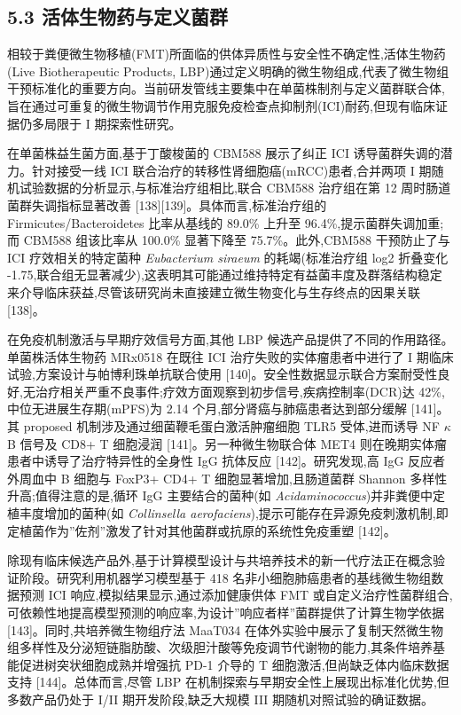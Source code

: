 \subsection{5.3 活体生物药与定义菌群}\label{ux6d3bux4f53ux751fux7269ux836fux4e0eux5b9aux4e49ux83ccux7fa4}

相较于粪便微生物移植(FMT)所面临的供体异质性与安全性不确定性,活体生物药(Live Biotherapeutic Products, LBP)通过定义明确的微生物组成,代表了微生物组干预标准化的重要方向。当前研发管线主要集中在单菌株制剂与定义菌群联合体,旨在通过可重复的微生物调节作用克服免疫检查点抑制剂(ICI)耐药,但现有临床证据仍多局限于 I 期探索性研究。

在单菌株益生菌方面,基于丁酸梭菌的 CBM588 展示了纠正 ICI 诱导菌群失调的潜力。针对接受一线 ICI 联合治疗的转移性肾细胞癌(mRCC)患者,合并两项 I 期随机试验数据的分析显示,与标准治疗组相比,联合 CBM588 治疗组在第 12 周时肠道菌群失调指标显著改善 {[}138{]}{[}139{]}。具体而言,标准治疗组的 Firmicutes/Bacteroidetes 比率从基线的 89.0\% 上升至 96.4\%,提示菌群失调加重;而 CBM588 组该比率从 100.0\% 显著下降至 75.7\%。此外,CBM588 干预防止了与 ICI 疗效相关的特定菌种 \emph{Eubacterium siraeum} 的耗竭(标准治疗组 log2 折叠变化 -1.75,联合组无显著减少),这表明其可能通过维持特定有益菌丰度及群落结构稳定来介导临床获益,尽管该研究尚未直接建立微生物变化与生存终点的因果关联 {[}138{]}。

在免疫机制激活与早期疗效信号方面,其他 LBP 候选产品提供了不同的作用路径。单菌株活体生物药 MRx0518 在既往 ICI 治疗失败的实体瘤患者中进行了 I 期临床试验,方案设计与帕博利珠单抗联合使用 {[}140{]}。安全性数据显示联合方案耐受性良好,无治疗相关严重不良事件;疗效方面观察到初步信号,疾病控制率(DCR)达 42\%,中位无进展生存期(mPFS)为 2.14 个月,部分肾癌与肺癌患者达到部分缓解 {[}141{]}。其 proposed 机制涉及通过细菌鞭毛蛋白激活肿瘤细胞 TLR5 受体,进而诱导 NF \(\kappa\) B 信号及 CD8+ T 细胞浸润 {[}141{]}。另一种微生物联合体 MET4 则在晚期实体瘤患者中诱导了治疗特异性的全身性 IgG 抗体反应 {[}142{]}。研究发现,高 IgG 反应者外周血中 B 细胞与 FoxP3+ CD4+ T 细胞显著增加,且肠道菌群 Shannon 多样性升高;值得注意的是,循环 IgG 主要结合的菌种(如 \emph{Acidaminococcus})并非粪便中定植丰度增加的菌种(如 \emph{Collinsella aerofaciens}),提示可能存在异源免疫刺激机制,即定植菌作为''佐剂''激发了针对其他菌群或抗原的系统性免疫重塑 {[}142{]}。

除现有临床候选产品外,基于计算模型设计与共培养技术的新一代疗法正在概念验证阶段。研究利用机器学习模型基于 418 名非小细胞肺癌患者的基线微生物组数据预测 ICI 响应,模拟结果显示,通过添加健康供体 FMT 或自定义治疗性菌群组合,可依赖性地提高模型预测的响应率,为设计''响应者样''菌群提供了计算生物学依据 {[}143{]}。同时,共培养微生物组疗法 MaaT034 在体外实验中展示了复制天然微生物组多样性及分泌短链脂肪酸、次级胆汁酸等免疫调节代谢物的能力,其条件培养基能促进树突状细胞成熟并增强抗 PD-1 介导的 T 细胞激活,但尚缺乏体内临床数据支持 {[}144{]}。总体而言,尽管 LBP 在机制探索与早期安全性上展现出标准化优势,但多数产品仍处于 I/II 期开发阶段,缺乏大规模 III 期随机对照试验的确证数据。

